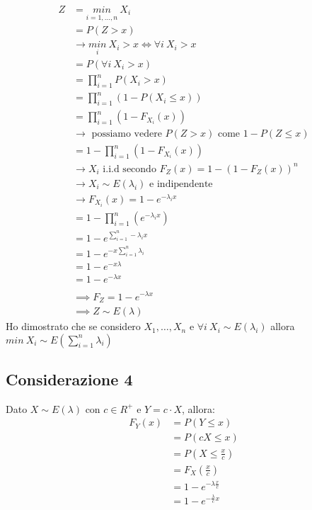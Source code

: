 \documentclass[11pt]{report}
\begin{document}
\begin{equation}
    \begin{split}
        Z & = \underset{i=1, \dots, n}{min}\ X_i\\
        & = P(Z > x)\\
        & \rightarrow \underset{i}{min}\ X_i > x \iff \forall i\ X_i > x\\
        & = P(\forall i\ X_i > x)\\
        & = \prod_{i=1}^n P(X_i > x)\\
        & = \prod_{i=1}^n \left( 1 - P(X_i \leq x) \right)\\
        & = \prod_{i=1}^n (1 - F_{X_i}(x))\\
        & \rightarrow \text{ possiamo vedere } P(Z > x) \text{ come } 1 - P(Z \leq x)\\
        & = 1 - \prod_{i=1}^n (1 - F_{X_i}(x))\\
        & \rightarrow X_i \text{ i.i.d secondo } F_Z(x) = 1 - (1 - F_Z(x))^n\\
        & \rightarrow X_i \sim E(\lambda_i) \text{ e indipendente}\\
        & \rightarrow F_{X_i}(x) = 1 - e^{-\lambda_i x}\\
        & = 1 - \prod_{i=1}^n (e^{-\lambda_i x})\\
        & = 1 - e^{\sum_{i=1}^n -\lambda_i x}\\
        & = 1 - e^{-x \sum_{i=1}^n \lambda_i}\\
        & = 1 - e^{-x \lambda}\\
        & = 1 - e^{-\lambda x}\\
        \\
        & \implies F_Z = 1 - e^{-\lambda x}\\
        & \implies Z \sim E(\lambda)
    \end{split}
\end{equation}
Ho dimostrato che se considero $X_1, \dots, X_n$ e $\forall i\ X_i \sim E(\lambda_i)$ allora $min\ X_i \sim E(\sum_{i=1}^n \lambda_i)$
\subsection{Considerazione 4}
Dato $X \sim E(\lambda)$ con $c \in R^+$ e $Y = c \cdot X$, allora:
\begin{equation}
    \begin{split}
        F_Y(x) & = P(Y \leq x)\\
        & = P(cX \leq x)\\
        & = P \left(X \leq \frac{x}{c} \right)\\
        & = F_X \left( \frac{x}{c} \right)\\
        & = 1 - e^{-\lambda \frac{x}{c}}\\
        & = 1 - e^{- \frac{\lambda}{c} x}
    \end{split}
\end{equation}
\end{document}
